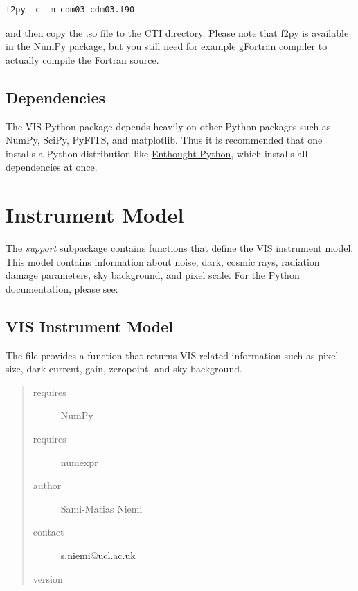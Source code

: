 \documentclass[a4paper,11pt,english]{sphinxmanual}
\begin{document}
\begin{Verbatim}[commandchars=\\\{\}]
f2py -c -m cdm03 cdm03.f90
\end{Verbatim}

and then copy the .so file to the CTI directory. Please note that f2py is available in the NumPy package,
but you still need for example gFortran compiler to actually compile the Fortran source.


\section{Dependencies}
\label{index:dependencies}
The VIS Python package depends heavily on other Python packages such as NumPy, SciPy, PyFITS, and matplotlib.
Thus it is recommended that one installs a Python distribution like \href{http://www.enthought.com/}{Enthought Python},
which installs all dependencies at once.


\chapter{Instrument Model}
\label{index:instrument-model}
The \emph{support} subpackage contains functions that define the VIS instrument model. This model contains information
about noise, dark, cosmic rays, radiation damage parameters, sky background, and pixel scale. For the Python
documentation, please see:
\label{instrument:module-support.VISinstrumentModel}

\section{VIS Instrument Model}
\label{instrument:vis-instrument-model}\label{instrument::doc}
The file provides a function that returns VIS related information such as pixel
size, dark current, gain, zeropoint, and sky background.
\begin{quote}\begin{description}
\item[{requires}] \leavevmode
NumPy

\item[{requires}] \leavevmode
numexpr

\item[{author}] \leavevmode
Sami-Matias Niemi

\item[{contact}] \leavevmode
\href{mailto:s.niemi@ucl.ac.uk}{s.niemi@ucl.ac.uk}

\item[{version}] 

\end{description}\end{quote}
\end{document}
